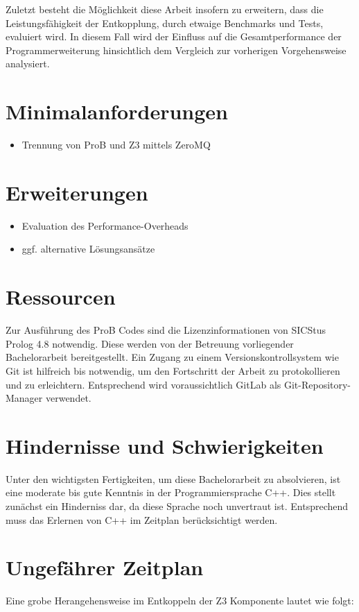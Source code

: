 \documentclass[11pt,a4paper]{scrartcl}
\begin{document}
Zuletzt besteht die Möglichkeit diese Arbeit insofern zu erweitern, dass die Leistungsfähigkeit der Entkopplung, durch etwaige Benchmarks und Tests, evaluiert wird.
In diesem Fall wird der Einfluss auf die Gesamtperformance der Programmerweiterung hinsichtlich dem Vergleich zur vorherigen Vorgehensweise analysiert.

\section{Minimalanforderungen}
\begin{itemize}
    \item Trennung von ProB und Z3 mittels ZeroMQ
\end{itemize}

\section{Erweiterungen}
\begin{itemize}
    \item Evaluation des Performance-Overheads
    \item ggf. alternative Lösungsansätze
\end{itemize}

\section{Ressourcen}
Zur Ausführung des ProB Codes sind die Lizenzinformationen von SICStus Prolog 4.8 notwendig.
Diese werden von der Betreuung vorliegender Bachelorarbeit bereitgestellt.
Ein Zugang zu einem Versionskontrollsystem wie Git ist hilfreich bis notwendig, um den Fortschritt der Arbeit zu protokollieren und zu erleichtern.
Entsprechend wird voraussichtlich GitLab als Git-Repository-Manager verwendet.

\section{Hindernisse und Schwierigkeiten}
Unter den wichtigsten Fertigkeiten, um diese Bachelorarbeit zu absolvieren, ist eine moderate bis gute Kenntnis in der Programmiersprache C++.
Dies stellt zunächst ein Hinderniss dar, da diese Sprache noch unvertraut ist. Entsprechend muss das Erlernen von C++ im Zeitplan berücksichtigt werden.

\section{Ungefährer Zeitplan}
Eine grobe Herangehensweise im Entkoppeln der Z3 Komponente lautet wie folgt:
\end{document}
